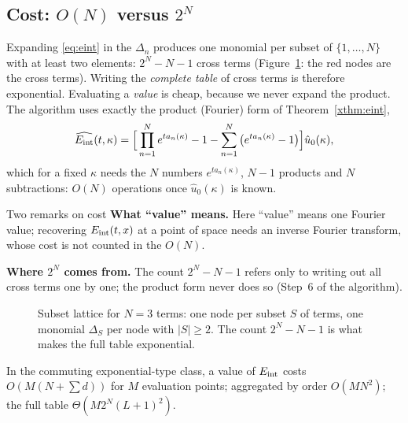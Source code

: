 \subsection{Cost: $O(N)$ versus $2^N$}
Expanding \eqref{eq:eint} in the $\Delta_n$ produces one monomial per subset of $\{1,\dots,N\}$ with at least two elements: $2^N-N-1$ cross terms (Figure~\ref{fig:lattice}: the red nodes are the cross terms). Writing the \emph{complete table} of cross terms is therefore exponential. Evaluating a \emph{value} is cheap, because we never expand the product. The algorithm uses exactly the product (Fourier) form of Theorem~\ref{xthm:eint},
\[
\widehat{E_{\mathrm{int}}}(t,\kappa)=\Big[\prod_{n=1}^Ne^{ta_n(\kappa)}-1-\sum_{n=1}^N\big(e^{ta_n(\kappa)}-1\big)\Big]\hat u_0(\kappa),
\]
which for a fixed $\kappa$ needs the $N$ numbers $e^{ta_n(\kappa)}$, $N-1$ products and $N$ subtractions: $O(N)$ operations once $\hat u_0(\kappa)$ is known.
\begin{aside}{Two remarks on cost}
\textbf{What ``value'' means.} Here ``value'' means one Fourier value; recovering $E_{\mathrm{int}}(t,x)$ at a point of space needs an inverse Fourier transform, whose cost is not counted in the $O(N)$.

\textbf{Where $2^N$ comes from.} The count $2^N-N-1$ refers only to writing out all cross terms one by one; the product form never does so (Step~6 of the algorithm).
\end{aside}
\begin{figure}[!htb]
\centering
{}
\caption{Subset lattice for $N=3$ terms: one node per subset $S$ of terms, one monomial $\Delta_S$ per node with $|S|\ge2$. The count $2^N-N-1$ is what makes the full table exponential.}\label{fig:lattice}
\end{figure}
\begin{proposition}
In the commuting exponential-type class, a value of $E_{\mathrm{int}}$ costs $O(M(N+\sum d))$ for $M$ evaluation points; aggregated by order $O(MN^2)$; the full table $\Theta(M2^N(L+1)^2)$.
\end{proposition}

